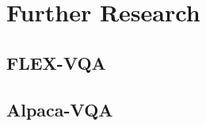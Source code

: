 \label{sec:5_3_further_research}  %
 \section{Further Research}



\subsection{FLEX-VQA}



\subsection{Alpaca-VQA}




